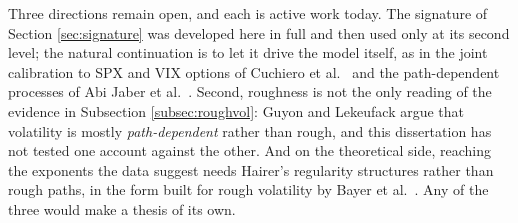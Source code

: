 Three directions remain open, and each is active work today. The signature of Section
\ref{sec:signature} was developed here in full and then used only at its second level; the natural
continuation is to let it drive the model itself, as in the joint calibration to SPX and VIX options
of Cuchiero et al.\ \cite{cuchiero2025} and the path-dependent processes of Abi Jaber et al.\
\cite{abijaber2024}. Second, roughness is not the only reading of the evidence in Subsection
\ref{subsec:roughvol}: Guyon and Lekeufack \cite{guyonlekeufack2022} argue that volatility is mostly
\emph{path-dependent} rather than rough, and this dissertation has not tested one account against
the other. And on the theoretical side, reaching the exponents the data suggest needs Hairer's
regularity structures \cite{hairer2014} rather than rough paths, in the form built for rough
volatility by Bayer et al.\ \cite{bayerfrizgassiat2020}. Any of the three would make a thesis of its
own.



